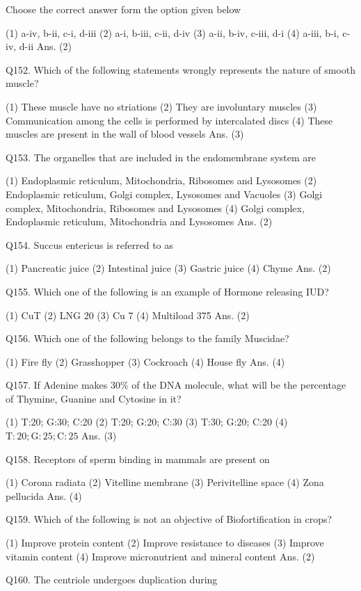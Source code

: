 \begin{enumerate}
Choose the correct answer form the option given below

(1) a-iv, b-ii, c-i, d-iii
(2) a-i, b-iii, c-ii, d-iv
(3) a-ii, b-iv, c-iii, d-i
(4) a-iii, b-i, c-iv, d-ii
Ans. (2)

Q152. Which of the following statements wrongly represents the nature of smooth muscle?

(1) These muscle have no striations
(2) They are involuntary muscles
(3) Communication among the cells is performed by intercalated discs
(4) These muscles are present in the wall of blood vessels
Ans. (3)

Q153. The organelles that are included in the endomembrane system are

(1) Endoplasmic reticulum, Mitochondria, Ribosomes and Lysosomes
(2) Endoplasmic reticulum, Golgi complex, Lysosomes and Vacuoles
(3) Golgi complex, Mitochondria, Ribosomes and Lysosomes
(4) Golgi complex, Endoplasmic reticulum, Mitochondria and Lysosomes
Ans. (2)

Q154. Succus entericus is referred to as

(1) Pancreatic juice
(2) Intestinal juice
(3) Gastric juice
(4) Chyme
Ans. (2)

Q155. Which one of the following is an example of Hormone releasing IUD?

(1) CuT
(2) LNG 20
(3) Cu 7
(4) Multiload 375
Ans. (2)

Q156. Which one of the following belongs to the family Muscidae?

(1) Fire fly
(2) Grasshopper
(3) Cockroach
(4) House fly
Ans. (4)

Q157. If Adenine makes $30 \%$ of the DNA molecule, what will be the percentage of Thymine, Guanine and Cytosine in it?

(1) T:20; G:30; C:20
(2) T:20; G:20; C:30
(3) T:30; G:20; C:20
(4) $\mathrm{T}: 20 ; \mathrm{G}: 25 ; \mathrm{C}: 25$
Ans. (3)

Q158. Receptors of sperm binding in mammals are present on

(1) Corona radiata
(2) Vitelline membrane
(3) Perivitelline space
(4) Zona pellucida
Ans. (4)

Q159. Which of the following is not an objective of Biofortification in crops?

(1) Improve protein content
(2) Improve resistance to diseases
(3) Improve vitamin content
(4) Improve micronutrient and mineral content
Ans. (2)

Q160. The centriole undergoes duplication during


\end{enumerate}
